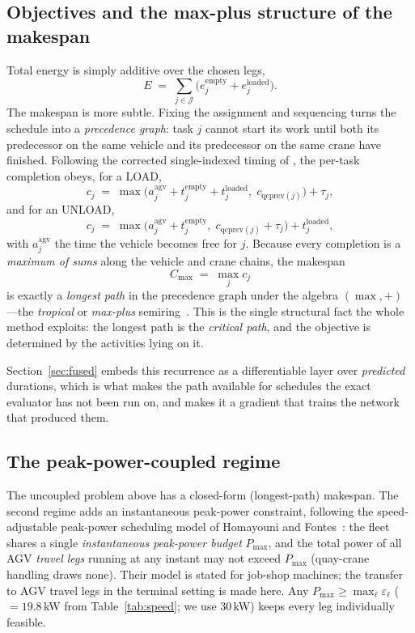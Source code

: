 \documentclass[11pt]{article}
\newcommand{\Cmax}{C_{\max}}
\begin{document}
\subsection{Objectives and the max-plus structure of the makespan}
\label{sec:maxplus}
Total energy is simply additive over the chosen legs,
\begin{equation}
E \;=\; \sum_{j\in\mathcal{J}} \big(e^{\text{empty}}_j + e^{\text{loaded}}_j\big).
\label{eq:energy}
\end{equation}
The makespan is more subtle. Fixing the assignment and sequencing turns the schedule into a
\emph{precedence graph}: task $j$ cannot start its work until both its predecessor on the
same vehicle and its predecessor on the same crane have finished. Following the corrected
single-indexed timing of \cite{fontes2023flowtime}, the per-task completion obeys, for a
LOAD,
\begin{equation}
c_j \;=\; \max\!\big(a^{\text{agv}}_j + t^{\text{empty}}_j + t^{\text{loaded}}_j,\;
c_{\mathrm{qcprev}(j)}\big) + \tau_j ,
\end{equation}
and for an UNLOAD,
\begin{equation}
c_j \;=\; \max\!\big(a^{\text{agv}}_j + t^{\text{empty}}_j,\; c_{\mathrm{qcprev}(j)} + \tau_j\big)
+ t^{\text{loaded}}_j ,
\end{equation}
with $a^{\text{agv}}_j$ the time the vehicle becomes free for $j$. Because every completion
is a \emph{maximum of sums} along the vehicle and crane chains, the makespan
\begin{equation}
\Cmax \;=\; \max_{j} c_j
\end{equation}
is exactly a \emph{longest path} in the precedence graph under the algebra
$(\max,+)$---the \emph{tropical} or \emph{max-plus} semiring~\cite{baccelli1992synch}. This
is the single structural fact the whole method exploits: the longest path is the
\emph{critical path}, and the objective is determined by the activities lying on it.

Section~\ref{sec:fused} embeds this recurrence as a differentiable layer over
\emph{predicted} durations, which is what makes the path available for schedules the exact
evaluator has not been run on, and makes it a gradient that trains the network that
produced them.

\subsection{The peak-power-coupled regime}
\label{sec:coupled}
The uncoupled problem above has a closed-form (longest-path) makespan. The second regime
adds an instantaneous peak-power constraint, following the speed-adjustable peak-power
scheduling model of Homayouni and Fontes~\cite{homayouni2025peakpower}: the fleet shares a
single \emph{instantaneous peak-power budget} $P_{\max}$, and the total power of all AGV
\emph{travel legs} running at any instant may not exceed $P_{\max}$ (quay-crane handling
draws none). Their model is stated for job-shop machines; the transfer to AGV travel legs in
the terminal setting is made here. Any
$P_{\max}\ge\max_\ell \varepsilon_\ell$ ($=19.8$\,kW from Table~\ref{tab:speed}; we use
$30$\,kW) keeps every leg individually feasible.
\end{document}
